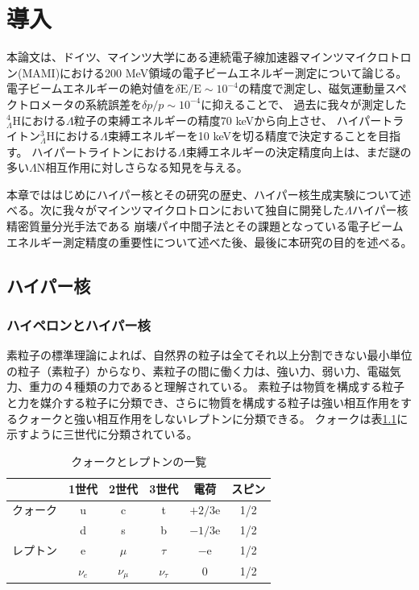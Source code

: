 \documentclass[a4paper,11pt,uplatex]{jsbook}
\begin{document}
\chapter{導入}
本論文は、ドイツ、マインツ大学にある連続電子線加速器マインツマイクロトロン(MAMI)における200 MeV領域の電子ビームエネルギー測定について論じる。
電子ビームエネルギーの絶対値を$\delta \text{E}/\text{E} \sim 10^{-4}$の精度で測定し、磁気運動量スペクトロメータの系統誤差を$\delta p/p \sim 10^{-4}$に抑えることで、
過去に我々が測定した$^4_{\Lambda} \text{H}$における$\Lambda$粒子の束縛エネルギーの精度$70$ keVから向上させ、
ハイパートライトン$^3_{\Lambda}\text{H}$における$\Lambda$束縛エネルギーを10 keVを切る精度で決定することを目指す。
ハイパートライトンにおける$\Lambda$束縛エネルギーの決定精度向上は、まだ謎の多い$\Lambda$N相互作用に対しさらなる知見を与える。

本章でははじめにハイパー核とその研究の歴史、ハイパー核生成実験について述べる。次に我々がマインツマイクロトロンにおいて独自に開発した$\Lambda$ハイパー核精密質量分光手法である
崩壊パイ中間子法とその課題となっている電子ビームエネルギー測定精度の重要性について述べた後、最後に本研究の目的を述べる。
\section{ハイパー核}

\subsection{ハイペロンとハイパー核}
素粒子の標準理論によれば、自然界の粒子は全てそれ以上分割できない最小単位の粒子（素粒子）からなり、素粒子の間に働く力は、強い力、弱い力、電磁気力、重力の４種類の力であると理解されている。
素粒子は物質を構成する粒子と力を媒介する粒子に分類でき、さらに物質を構成する粒子は強い相互作用をするクォークと強い相互作用をしないレプトンに分類できる。
クォークは表\ref{tab:quark}に示すように三世代に分類されている。
\begin{table}[t]
\centering
\begin{tabular}{c||c|c|c||c|c}
  \hline
  & 1世代 & 2世代 & 3世代 & 電荷 & スピン\\
  \hline\hline
  クォーク & u & c & t & $+2/3$e & 1/2\\
  & d & s & b & $-1/3$e & 1/2\\ \hline
  レプトン & e& $\mu$& $\tau$& $-$e& 1/2\\
  &$\nu_e$ & $\nu_\mu$& $\nu_\tau$& 0 & 1/2\\
  \hline
\end{tabular}
\caption{クォークとレプトンの一覧}\label{tab:quark}
\end{table}
\end{document}
